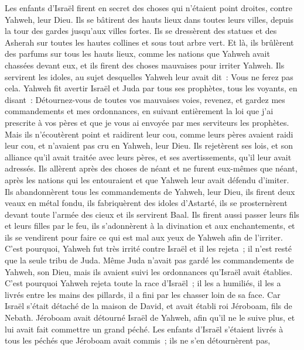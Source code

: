 \begin{multicols}{2}
Les enfants d'Israël firent en secret des choses qui n'étaient point droites, contre Yahweh, leur Dieu. Ils se bâtirent des hauts lieux dans toutes leurs villes, depuis la tour des gardes jusqu'aux villes fortes.
Ils se dressèrent des statues et des Asherah sur toutes les hautes collines et sous tout arbre vert.
Et là, ils brûlèrent des parfums sur tous les hauts lieux, comme les nations que Yahweh avait chassées devant eux, et ils firent des choses mauvaises pour irriter Yahweh.
Ils servirent les idoles, au sujet desquelles Yahweh leur avait dit~: Vous ne ferez pas cela.
Yahweh fit avertir Israël et Juda par tous ses prophètes, tous les voyants, en disant~: Détournez-vous de toutes vos mauvaises voies, revenez, et gardez mes commandements et mes ordonnances, en suivant entièrement la loi que j'ai prescrite à vos pères et que je vous ai envoyée par mes serviteurs les prophètes.
Mais ils n'écoutèrent point et raidirent leur cou, comme leurs pères avaient raidi leur cou, et n'avaient pas cru en Yahweh, leur Dieu.
Ils rejetèrent ses lois, et son alliance qu'il avait traitée avec leurs pères, et ses avertissements, qu'il leur avait adressés. Ils allèrent après des choses de néant et ne furent eux-mêmes que néant, après les nations qui les entouraient et que Yahweh leur avait défendu d'imiter.
Ils abandonnèrent tous les commandements de Yahweh, leur Dieu, ils firent deux veaux en métal fondu, ils fabriquèrent des idoles d'Astarté, ils se prosternèrent devant toute l'armée des cieux et ils servirent Baal.
Ils firent aussi passer leurs fils et leurs filles par le feu, ils s'adonnèrent à la divination et aux enchantements, et ils se vendirent pour faire ce qui est mal aux yeux de Yahweh afin de l'irriter.
C'est pourquoi, Yahweh fut très irrité contre Israël et il les rejeta~; il n'est resté que la seule tribu de Juda.
Même Juda n'avait pas gardé les commandements de Yahweh, son Dieu, mais ils avaient suivi les ordonnances qu'Israël avait établies.
C'est pourquoi Yahweh rejeta toute la race d'Israël~; il les a humiliés, il les a livrés entre les mains des pillards, il a fini par les chasser loin de sa face.
Car Israël s'était détaché de la maison de David, et avait établi roi Jéroboam, fils de Nebath. Jéroboam avait détourné Israël de Yahweh, afin qu'il ne le suive plus, et lui avait fait commettre un grand péché.
Les enfants d'Israël s'étaient livrés à tous les péchés que Jéroboam avait commis~; ils ne s'en détournèrent pas,

\end{multicols}
